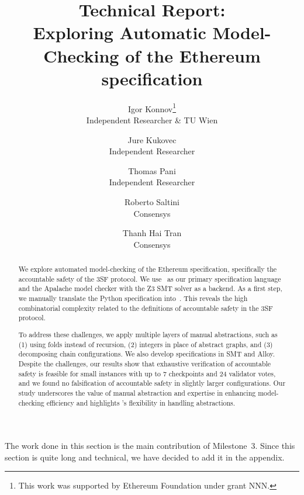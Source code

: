 \documentclass[12pt]{article}
\title{Technical Report:\\
       Exploring Automatic Model-Checking of the Ethereum specification}
\author{%
    Igor Konnov\thanks{This work was supported by Ethereum Foundation
    under grant NNN.}\\ \small Independent Researcher \& TU Wien \\
    \and
    Jure Kukovec\footnotemark[1] \\ \small Independent Researcher \\
    \and
    Thomas Pani\footnotemark[1] \\ \small Independent Researcher\\
    \and
    Roberto Saltini \\ \small Consensys \\
    \and
    Thanh Hai Tran \\ \small Consensys
}
\date{}
\begin{document}
\maketitle

\begin{abstract}

We explore automated model-checking of the Ethereum specification, specifically
the accountable safety of the 3SF protocol. We use~\tlap{} as our primary
specification language and the Apalache model checker with the Z3 SMT solver as
a backend. As a first step, we manually translate the Python specification
into~\tlap{}. This reveals the high combinatorial complexity related to the
definitions of accountable safety in the 3SF protocol.

To address these challenges, we apply multiple layers of manual abstractions,
such as (1) using folds instead of recursion, (2) integers in place of abstract
graphs, and (3) decomposing chain configurations. We also develop
specifications in SMT and Alloy. Despite the challenges, our results show that
exhaustive verification of accountable safety is feasible for small
instances with up to 7 checkpoints and 24 validator votes, and we found no
falsification of accountable safety in slightly larger configurations. Our
study underscores the value of manual abstraction and expertise in enhancing
model-checking efficiency and highlights \tlap{}'s flexibility in handling
abstractions.

\end{abstract}

\setcounter{tocdepth}{2}  %
\tableofcontents

















\pagebreak

\appendix

The work done in this section is the main contribution of Milestone~3. Since
this section is quite long and technical, we have decided to add it in the
appendix.




\end{document}

